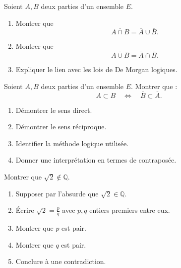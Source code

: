 \documentclass[11pt,a4paper]{article}
\newcommand{\Q}{\mathbb{Q}}
\begin{document}
\begin{exercicebox}
Soient \(A,B\) deux parties d'un ensemble \(E\).

\begin{enumerate}[label=\alph*)]
    \item Montrer que
    \[
    \overline{A\cap B}=\overline A\cup \overline B.
    \]
    \item Montrer que
    \[
    \overline{A\cup B}=\overline A\cap \overline B.
    \]
    \item Expliquer le lien avec les lois de De Morgan logiques.
\end{enumerate}
\end{exercicebox}

\begin{exercicebox}
Soient \(A,B\) deux parties d'un ensemble \(E\). Montrer que :
\[
A\subset B \quad \Longleftrightarrow\quad \overline B\subset \overline A.
\]

\begin{enumerate}[label=\alph*)]
    \item Démontrer le sens direct.
    \item Démontrer le sens réciproque.
    \item Identifier la méthode logique utilisée.
    \item Donner une interprétation en termes de contraposée.
\end{enumerate}
\end{exercicebox}

\begin{exercicebox}
Montrer que \(\sqrt2\notin\Q\).

\begin{enumerate}[label=\alph*)]
    \item Supposer par l'absurde que \(\sqrt2\in\Q\).
    \item Écrire \(\sqrt2=\frac pq\) avec \(p,q\) entiers premiers entre eux.
    \item Montrer que \(p\) est pair.
    \item Montrer que \(q\) est pair.
    \item Conclure à une contradiction.
\end{enumerate}
\end{exercicebox}
\end{document}
